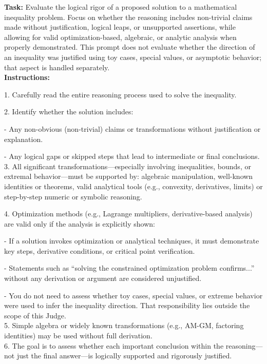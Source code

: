 \begin{textcolorbox}
\textbf{Task:} Evaluate the logical rigor of a proposed solution to a mathematical inequality problem. Focus on whether the reasoning includes non-trivial claims made without justification, logical leaps, or unsupported assertions, while allowing for valid optimization-based, algebraic, or analytic analysis when properly demonstrated.
This prompt does not evaluate whether the direction of an inequality was justified using toy cases, special values, or asymptotic behavior; that aspect is handled separately. \\

\textbf{Instructions:}

1. Carefully read the entire reasoning process used to solve the inequality.

2. Identify whether the solution includes:

\quad - Any non-obvious (non-trivial) claims or transformations without justification or explanation.

\quad - Any logical gaps or skipped steps that lead to intermediate or final conclusions.\\
3. All significant transformations—especially involving inequalities, bounds, or extremal behavior—must be supported by: algebraic manipulation, well-known identities or theorems, valid analytical tools (e.g., convexity, derivatives, limits) or step-by-step numeric or symbolic reasoning.

4. Optimization methods (e.g., Lagrange multipliers, derivative-based analysis) are valid only if the analysis is explicitly shown:

\quad - If a solution invokes optimization or analytical techniques, it must demonstrate key steps, derivative conditions, or critical point verification.

\quad - Statements such as ``solving the constrained optimization problem confirms...'' without any derivation or argument are considered unjustified.

\quad - You do not need to assess whether toy cases, special values, or extreme behavior were used to infer the inequality direction. That responsibility lies outside the scope of this Judge.\\
5. Simple algebra or widely known transformations (e.g., AM-GM, factoring identities) may be used without full derivation.\\
6. The goal is to assess whether each important conclusion within the reasoning—not just the final answer—is logically supported and rigorously justified.\\


\end{textcolorbox}
